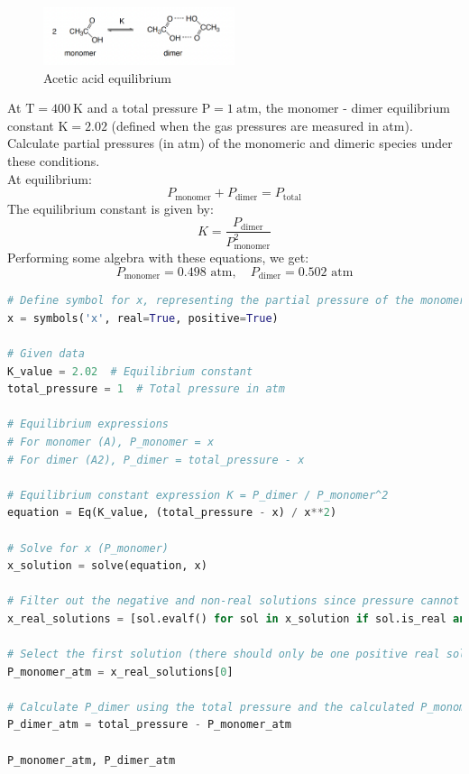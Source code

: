 \documentclass[12 pt]{article}
\begin{document}
\begin{figure}[h]
  \centering
  \includegraphics[width=0.5\textwidth]{image.png}
  \caption{Acetic acid equilibrium}
\end{figure}

At $\mathrm{T}=400 \mathrm{~K}$ and a total pressure $\mathrm{P}=1 \mathrm{~atm}$, the monomer - dimer equilibrium constant $\mathrm{K}=2.02$ (defined when the gas pressures are measured in atm). Calculate partial pressures (in atm) of the monomeric and dimeric species under these conditions.\\
At equilibrium:
\begin{equation}
  P_{\text{monomer}} + P_{\text{dimer}} = P_{\text{total}}
\end{equation}
The equilibrium constant is given by:
\begin{equation}
  K = \frac{P_{\text{dimer}}}{P_{\text{monomer}}^2}
\end{equation}
Performing some algebra with these equations, we get:
\begin{equation}
  P_{\text{monomer}} = 0.498 \text{ atm}, \quad P_{\text{dimer}} = 0.502 \text{ atm}
\end{equation}
\begin{lstlisting}[language=Python]
# Define symbol for x, representing the partial pressure of the monomer
x = symbols('x', real=True, positive=True)

# Given data
K_value = 2.02  # Equilibrium constant
total_pressure = 1  # Total pressure in atm

# Equilibrium expressions
# For monomer (A), P_monomer = x
# For dimer (A2), P_dimer = total_pressure - x

# Equilibrium constant expression K = P_dimer / P_monomer^2
equation = Eq(K_value, (total_pressure - x) / x**2)

# Solve for x (P_monomer)
x_solution = solve(equation, x)

# Filter out the negative and non-real solutions since pressure cannot be negative or non-real
x_real_solutions = [sol.evalf() for sol in x_solution if sol.is_real and sol > 0]

# Select the first solution (there should only be one positive real solution in this physical context)
P_monomer_atm = x_real_solutions[0]

# Calculate P_dimer using the total pressure and the calculated P_monomer
P_dimer_atm = total_pressure - P_monomer_atm

P_monomer_atm, P_dimer_atm

\end{lstlisting}
\end{document}
